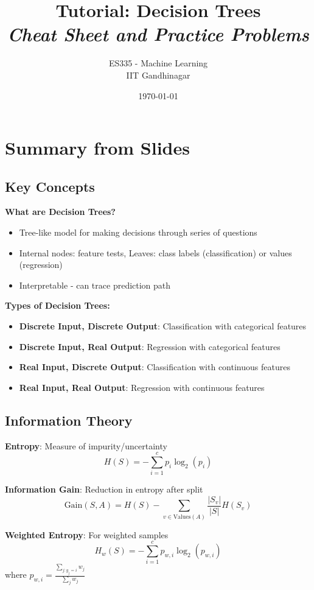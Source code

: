 \documentclass{article}
\title{\textbf{Tutorial: Decision Trees} \\ \textit{Cheat Sheet and Practice Problems}}
\author{ES335 - Machine Learning \\ IIT Gandhinagar}
\date{\today}
\begin{document}
\maketitle

\section{Summary from Slides}

\subsection{Key Concepts}

\textbf{What are Decision Trees?}
\begin{itemize}
    \item Tree-like model for making decisions through series of questions
    \item Internal nodes: feature tests, Leaves: class labels (classification) or values (regression)
    \item Interpretable - can trace prediction path
\end{itemize}

\textbf{Types of Decision Trees:}
\begin{itemize}
    \item \textbf{Discrete Input, Discrete Output}: Classification with categorical features
    \item \textbf{Discrete Input, Real Output}: Regression with categorical features  
    \item \textbf{Real Input, Discrete Output}: Classification with continuous features
    \item \textbf{Real Input, Real Output}: Regression with continuous features
\end{itemize}

\subsection{Information Theory}

\textbf{Entropy}: Measure of impurity/uncertainty
$$H(S) = -\sum_{i=1}^c p_i \log_2(p_i)$$

\textbf{Information Gain}: Reduction in entropy after split
$$\text{Gain}(S, A) = H(S) - \sum_{v \in \text{Values}(A)} \frac{|S_v|}{|S|} H(S_v)$$

\textbf{Weighted Entropy}: For weighted samples
$$H_w(S) = -\sum_{i=1}^c p_{w,i} \log_2(p_{w,i})$$
where $p_{w,i} = \frac{\sum_{j: y_j = i} w_j}{\sum_{j} w_j}$
\end{document}
